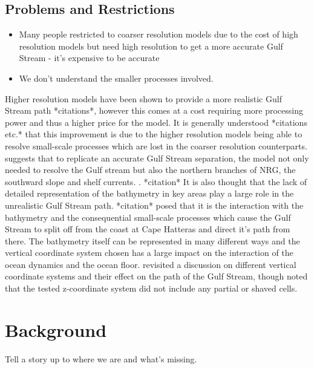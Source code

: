 \documentclass[a4paper,11pt]{article}
\begin{document}
\subsection{Problems and Restrictions}
\begin{itemize}
  \item Many people restricted to coarser resolution models due to the cost of high resolution models but need high resolution to get a more accurate Gulf Stream - it's expensive to be accurate
  \item We don't understand the smaller processes involved. \citep{Nikurashin2012a}
\end{itemize}
Higher resolution models have been shown to provide a more realistic Gulf Stream path *citations*, however this comes at a cost requiring more processing power and thus a higher price for the model. It is generally understood *citations \citep{Nikurashin2012a} etc.* that this improvement is due to the higher resolution models being able to resolve small-scale processes which are lost in the coarser resolution counterparts. \citep{Ezer2016b} suggests that to replicate an accurate Gulf Stream separation, the model not only needed to resolve the Gulf stream but also the northern branches of NRG, the southward slope and shelf currents. . *citation* It is also thought that the lack of detailed representation of the bathymetry in key areas play a large role in the unrealistic Gulf Stream path. *citation* posed that it is the interaction with the bathymetry and the consequential small-scale processes which cause the Gulf Stream to split off from the coast at Cape Hatteras and direct it’s path from there. The bathymetry itself can be represented in many different ways and the vertical coordinate system chosen has a large impact on the interaction of the ocean dynamics and the ocean floor. \citep{Ezer2016b} revisited a discussion on different vertical coordinate systems and their effect on the path of the Gulf Stream, though noted that the tested z-coordinate system did not include any partial or shaved cells. 


\section{Background}
Tell a story up to where we are and what's missing.
\end{document}

